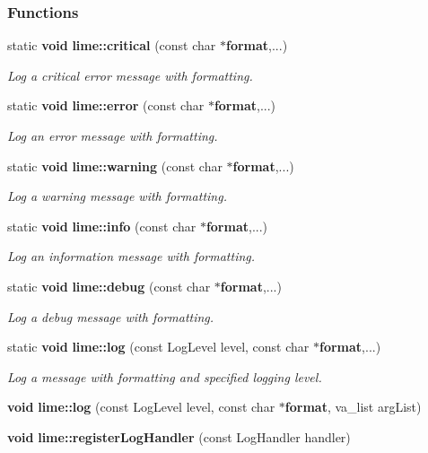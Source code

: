 \subsubsection*{Functions}
\begin{DoxyCompactItemize}
\item 
static {\bf void} {\bf lime\+::critical} (const char $\ast${\bf format},...)
\begin{DoxyCompactList}\small\item\em Log a critical error message with formatting. \end{DoxyCompactList}\item 
static {\bf void} {\bf lime\+::error} (const char $\ast${\bf format},...)
\begin{DoxyCompactList}\small\item\em Log an error message with formatting. \end{DoxyCompactList}\item 
static {\bf void} {\bf lime\+::warning} (const char $\ast${\bf format},...)
\begin{DoxyCompactList}\small\item\em Log a warning message with formatting. \end{DoxyCompactList}\item 
static {\bf void} {\bf lime\+::info} (const char $\ast${\bf format},...)
\begin{DoxyCompactList}\small\item\em Log an information message with formatting. \end{DoxyCompactList}\item 
static {\bf void} {\bf lime\+::debug} (const char $\ast${\bf format},...)
\begin{DoxyCompactList}\small\item\em Log a debug message with formatting. \end{DoxyCompactList}\item 
static {\bf void} {\bf lime\+::log} (const Log\+Level level, const char $\ast${\bf format},...)
\begin{DoxyCompactList}\small\item\em Log a message with formatting and specified logging level. \end{DoxyCompactList}\item 
{\bf void} {\bf lime\+::log} (const Log\+Level level, const char $\ast${\bf format}, va\+\_\+list arg\+List)
\item 
{\bf void} {\bf lime\+::register\+Log\+Handler} (const Log\+Handler handler)

\end{DoxyCompactItemize}
